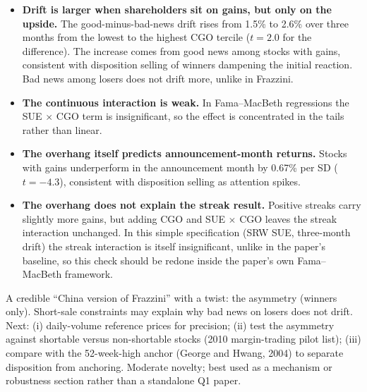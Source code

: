 \begin{itemize}
\item \textbf{Drift is larger when shareholders sit on gains, but only on the upside.} The good-minus-bad-news drift
  rises from 1.5\% to 2.6\% over three months from the lowest to the highest CGO tercile ($t=2.0$ for the
  difference). The increase comes from good news among stocks with gains, consistent with disposition selling of
  winners dampening the initial reaction. Bad news among losers does not drift more, unlike in Frazzini.
\item \textbf{The continuous interaction is weak.} In Fama--MacBeth regressions the SUE $\times$ CGO term is
  insignificant, so the effect is concentrated in the tails rather than linear.
\item \textbf{The overhang itself predicts announcement-month returns.} Stocks with gains underperform in the
  announcement month by 0.67\% per SD ($t=-4.3$), consistent with disposition selling as attention spikes.
\item \textbf{The overhang does not explain the streak result.} Positive streaks carry slightly more gains, but
  adding CGO and SUE $\times$ CGO leaves the streak interaction unchanged. In this simple specification (SRW SUE,
  three-month drift) the streak interaction is itself insignificant, unlike in the paper's baseline, so this check
  should be redone inside the paper's own Fama--MacBeth framework.
\end{itemize}

A credible ``China version of Frazzini'' with a twist: the asymmetry (winners only). Short-sale constraints may
explain why bad news on losers does not drift. Next: (i) daily-volume reference prices for precision;
(ii) test the asymmetry against shortable versus non-shortable stocks (2010 margin-trading pilot list); (iii)
compare with the 52-week-high anchor (George and Hwang, 2004) to separate disposition from anchoring. Moderate
novelty; best used as a mechanism or robustness section rather than a standalone Q1 paper.


